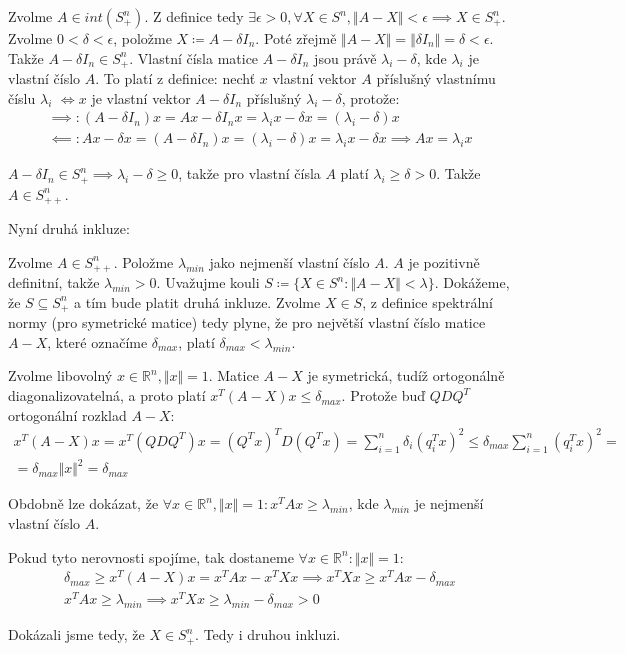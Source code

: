 \documentclass[12pt, a4paper]{article}
\begin{document}
Zvolme $A \in int(S^n_+)$. Z definice tedy  $\exists \epsilon > 0, \forall X \in S^n, \Vert A-X \Vert < \epsilon \implies X \in S^n_+$. Zvolme $0 < \delta < \epsilon$, položme $X \coloneqq  A - \delta I_n$. Poté zřejmě $\Vert A - X \Vert = \Vert \delta I_n \Vert = \delta < \epsilon$. Takže $A-\delta I_n \in S^n_+$. Vlastní čísla matice $A-\delta I_n$ jsou právě $\lambda_i - \delta$, kde $\lambda_i$ je vlastní číslo $A$. To platí z definice: nechť $x$ vlastní vektor $A$ příslušný vlastnímu číslu $\lambda_i$ $\iff x$ je vlastní vektor $A-\delta I_n$ příslušný $\lambda_i - \delta$, protože:
\begin{gather*}
\implies: (A-\delta I_n)x = Ax - \delta I_n x = \lambda_i x - \delta x = (\lambda_i -\delta) x\\
\impliedby: Ax - \delta x = (A-\delta I_n)x = (\lambda_i - \delta)x = \lambda_i x - \delta x \implies Ax = \lambda_i x
\end{gather*}

$A-\delta I_n \in S^n_+ \implies \lambda_i-\delta \geq 0$, takže pro vlastní čísla $A$ platí $\lambda_i \geq \delta > 0$. Takže $A \in S^n_{++}$.

Nyní druhá inkluze:

Zvolme $A \in S^n_{++}$. Položme $\lambda_{min}$ jako nejmenší vlastní číslo $A$. $A$ je pozitivně definitní, takže $\lambda_{min} > 0$. Uvažujme kouli $S \coloneqq \{ X \in S^n: \Vert A-X \Vert < \lambda\}$. Dokážeme, že $S \subseteq S^n_+$ a tím bude platit druhá inkluze. Zvolme $X \in S$, z definice spektrální normy (pro symetrické matice) tedy plyne, že pro největší vlastní číslo matice $A-X$, které označíme $\delta_{max}$, platí $\delta_{max} < \lambda_{min}$. 

Zvolme libovolný $x \in \mathbb{R}^n, \Vert x \Vert = 1$. Matice $A-X$ je symetrická, tudíž ortogonálně diagonalizovatelná, a proto platí $x^T(A-X)x \leq \delta_{max}$. Protože buď $QDQ^T$ ortogonální rozklad $A-X$:
\begin{gather*}
x^T(A-X)x = x^T(QDQ^T)x = (Q^Tx)^TD(Q^Tx) = \sum_{i=1}^n \delta_i (q_i^Tx)^2 \leq  \delta_{max} \sum_{i=1}^n (q_i^Tx)^2 =  \\
= \delta_{max}\Vert x \Vert^2 = \delta_{max}
\end{gather*}

Obdobně lze dokázat, že $\forall x \in \mathbb{R}^n, \Vert x \Vert = 1: x^T A x \geq \lambda_{min}$, kde $\lambda_{min}$ je nejmenší vlastní číslo $A$.

Pokud tyto nerovnosti spojíme, tak dostaneme $\forall x \in \mathbb{R}^n: \Vert x \Vert = 1$:
\begin{gather*}
\delta_{max} \geq x^T(A-X)x = x^TAx - x^TXx \implies x^TXx \geq x^TAx - \delta_{max}\\
x^TAx \geq \lambda_{min} \implies x^TXx \geq \lambda_{min} - \delta_{max} > 0
\end{gather*}

Dokázali jsme tedy, že $X \in S^n_{+}$. Tedy i druhou inkluzi.

\section{}
\end{document}
